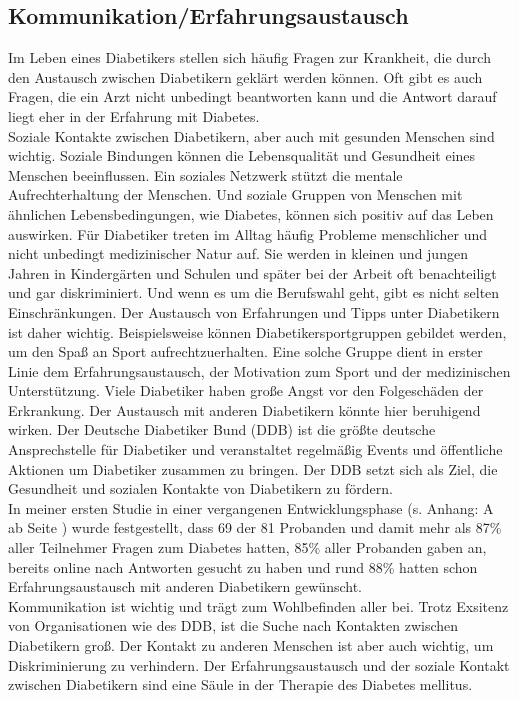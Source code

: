 \subsection{Kommunikation/Erfahrungsaustausch}
	Im Leben eines Diabetikers stellen sich häufig Fragen zur Krankheit, die durch den Austausch zwischen Diabetikern geklärt werden können. Oft gibt es auch Fragen, die ein Arzt nicht unbedingt beantworten kann und die Antwort darauf liegt eher in der Erfahrung mit Diabetes.\cite{JR}\\
	Soziale Kontakte zwischen Diabetikern, aber auch mit gesunden Menschen sind wichtig. Soziale Bindungen können die Lebensqualität und Gesundheit eines Menschen beeinflussen. Ein soziales Netzwerk stützt die mentale Aufrechterhaltung der Menschen. Und soziale Gruppen von Menschen mit ähnlichen Lebensbedingungen, wie Diabetes, können sich positiv auf das Leben auswirken. \newline
	Für Diabetiker treten im Alltag häufig Probleme menschlicher und nicht unbedingt medizinischer Natur auf. Sie werden in kleinen und jungen Jahren in Kindergärten und Schulen und später bei der Arbeit oft benachteiligt und gar diskriminiert. Und wenn es um die Berufswahl geht, gibt es nicht selten Einschränkungen. Der Austausch von Erfahrungen und Tipps unter Diabetikern ist daher wichtig. Beispielsweise können Diabetikersportgruppen gebildet werden, um den Spaß an Sport aufrechtzuerhalten. Eine solche Gruppe dient in erster Linie dem Erfahrungsaustausch, der Motivation zum Sport und der medizinischen Unterstützung. Viele Diabetiker haben große Angst vor den Folgeschäden der Erkrankung. Der Austausch mit anderen Diabetikern könnte hier beruhigend wirken. \cite{SG}\newline
	Der Deutsche Diabetiker Bund (DDB) ist die größte deutsche Ansprechstelle für Diabetiker und veranstaltet regelmäßig Events und öffentliche Aktionen um Diabetiker zusammen zu bringen. Der DDB setzt sich als Ziel, die Gesundheit und sozialen Kontakte von Diabetikern zu fördern.\cite{JR}\\
	In meiner ersten Studie in einer vergangenen Entwicklungsphase (s. Anhang: A  ab Seite \pageref{section:Evaluation}) wurde festgestellt, dass 69 der 81 Probanden und damit mehr als 87\% aller Teilnehmer Fragen zum Diabetes hatten, 85\% aller Probanden gaben an, bereits online nach Antworten gesucht zu haben und rund 88\% hatten schon Erfahrungsaustausch mit anderen Diabetikern gewünscht.\\
	Kommunikation ist wichtig und trägt zum Wohlbefinden aller bei. Trotz Exsitenz von Organisationen wie des DDB, ist die Suche nach Kontakten zwischen Diabetikern groß. Der Kontakt zu anderen Menschen ist aber auch wichtig, um Diskriminierung zu verhindern. Der Erfahrungsaustausch und der soziale Kontakt zwischen Diabetikern sind eine Säule in der Therapie des Diabetes mellitus.

